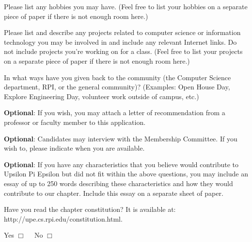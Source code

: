 \documentclass{article}
\begin{document}
\vspace*{2.5in}

Please list any hobbies you may have.
(Feel free to list your hobbies on a separate piece of paper if there is not enough room here.)

\newpage \vspace*{0.1in}

Please list and describe any projects related to computer science or information technology you may be involved in and include any relevant Internet links.
Do not include projects you're working on for a class.
(Feel free to list your projects on a separate piece of paper if there is not enough room here.)

\vspace*{3in}

In what ways have you given back to the community (the Computer Science department, RPI, or the general community)? 
(Examples: Open House Day, Explore Engineering Day, volunteer work outside of campus, etc.)


\newpage \vspace*{0.1in}

\textbf{Optional}: If you wish, you may attach a letter of recommendation from a professor or faculty member to this application.

\vspace*{0.3in}

\textbf{Optional}: Candidates may interview with the Membership Committee. If you wish to, please indicate when you are available.

\vspace*{0.6in}

\textbf{Optional}: If you have any characteristics that you believe would contribute to Upsilon Pi Epsilon but did not fit within the above questions, you may include an essay of up to 250 words describing these characteristics and how they would contribute to our chapter. 
Include this essay on a separate sheet of paper.

\vspace*{0.3in}

Have you read the chapter constitution?
It is available at: http://upe.cs.rpi.edu/constitution.html.

\vspace{0.2in}

\hspace*{15pt} Yes $\Box$ \ \ No $\Box$
\end{document}
